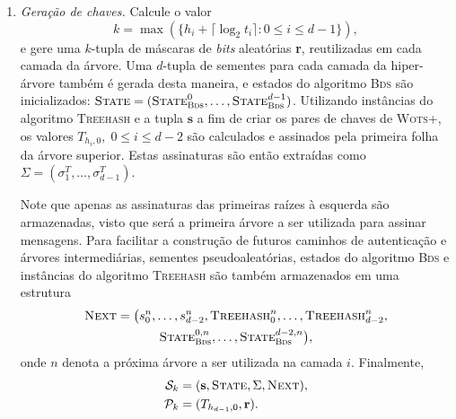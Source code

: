 \documentclass{ufsctex/ufsctex}
\newcommand{\pk}{\mathcal{P}_{k}}
\newcommand{\sk}{\mathcal{S}_{k}}
\newcommand{\bds}{\textsc{Bds}}
\newcommand{\wotsplus}{\textsc{Wots+}}
\begin{document}
\begin{enumerate}

  \item[] \emph{Geração de chaves.} Calcule o valor
      \begin{equation}
        k = \max(\{h_{i} + \lceil \log_2 t_{i} \rceil : 0 \leq i \leq d - 1\}),
      \end{equation}
        e gere uma $k$-tupla de máscaras de \emph{bits} aleatórias \textbf{r},
        reutilizadas em cada camada da árvore. Uma $d$-tupla de sementes para
        cada camada da hiper-árvore também é gerada desta maneira, e estados do
        algoritmo \bds{} são inicializados: $\textsc{State} =
        (\textsc{State}_{\bds{}}^{0}, \dots, \textsc{State}_{\bds{}}^{d - 1})$.
        Utilizando instâncias do algoritmo \textsc{Treehash} e a tupla
        $\textbf{s}$ a fim de criar os pares de chaves de \wotsplus{}, os
        valores $T_{h_{i}, 0}, \; 0 \leq i \leq d - 2$ são calculados e
        assinados pela primeira folha da árvore superior. Estas assinaturas são
        então extraídas como $\Sigma = (\sigma_{1}^{T}, \dots, \sigma_{d -
        1}^{T})$.

        Note que apenas as assinaturas das primeiras raízes à esquerda são
        armazenadas, visto que será a primeira árvore a ser utilizada para
        assinar mensagens. Para facilitar a construção de futuros caminhos de
        autenticação e árvores intermediárias, sementes pseudoaleatórias,
        estados do algoritmo \bds{} e instâncias do algoritmo \textsc{Treehash}
        são também armazenados em uma estrutura
        \begin{multline}
          \textsc{Next} = \big(s^{n}_{0}, \dots, s^{n}_{d - 2},
            \textsc{Treehash}^{n}_{0}, \dots, \textsc{Treehash}^{n}_{d - 2}, \\
            \textsc{State}_{\bds{}}^{0, n},
            \dots, \textsc{State}_{\bds{}}^{d - 2, n}\big),
        \end{multline}
        onde $n$ denota a próxima árvore a ser utilizada na camada $i$.
        Finalmente,
        \begin{align}
          \sk{} &= (\textbf{s}, \textsc{State}, \Sigma, \textsc{Next}), \\
          \pk{} &= (T_{h_{d - 1}, 0}, \mathbf{r}).
        \end{align}


\end{enumerate}
\end{document}
